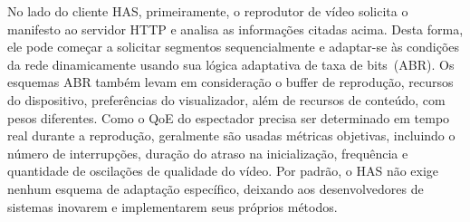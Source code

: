 No lado do cliente HAS, primeiramente, o reprodutor de vídeo solicita o manifesto ao servidor HTTP e analisa as informações citadas acima. Desta forma, ele pode começar a solicitar segmentos sequencialmente e adaptar-se às condições da rede dinamicamente usando sua lógica adaptativa de taxa de bits~(ABR). Os esquemas ABR também levam em consideração o buffer de reprodução, recursos do dispositivo, preferências do visualizador, além de recursos de conteúdo, com pesos diferentes. 
Como o QoE do espectador precisa ser determinado em tempo real durante a reprodução, geralmente são usadas métricas objetivas, incluindo o número de interrupções, duração do atraso na inicialização, frequência e quantidade de oscilações de qualidade do vídeo. Por padrão, o HAS não exige nenhum esquema de adaptação específico, deixando aos desenvolvedores de sistemas inovarem e implementarem seus próprios métodos.




